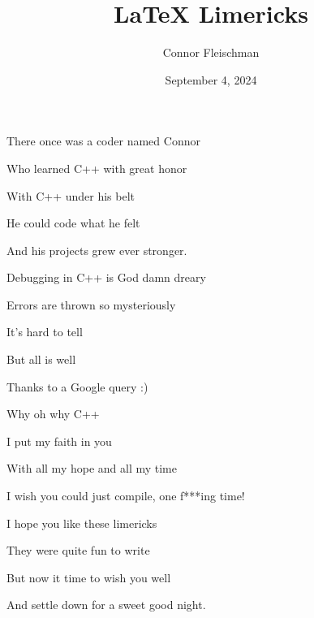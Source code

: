 \documentclass[12pt, letterpaper]{article}
\title {LaTeX Limericks}
\author{Connor Fleischman}
\date{September 4, 2024}
\begin{document}
\maketitle
\begin{center}
There once was a coder named Connor

Who learned C++ with great honor

With C++ under his belt

He could code what he felt

And his projects grew ever stronger.
\end{center}

\begin{center}
Debugging in C++ is God damn dreary

Errors are thrown so mysteriously

It's hard to tell

But all is well

Thanks to a Google query :)
\end{center}

\begin{center}
Why oh why C++

I put my faith in you

With all my hope and all my time

I wish you could just compile, one f***ing time!
\end{center}

\begin{center}

I hope you like these limericks

They were quite fun to write

But now it time to wish you well

And settle down for a sweet good night. 
\end{center}
\end{document}
